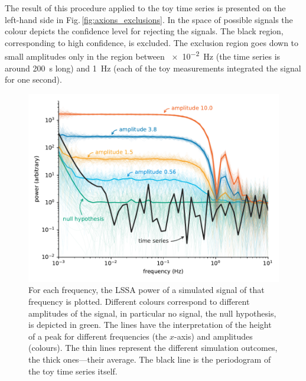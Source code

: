 The result of this procedure applied to the toy time series is presented on the left-hand side in Fig.\,\ref{fig:axions_exclusions}. In the space of possible signals the colour depicts the confidence level for rejecting the signals. The black region, corresponding to high confidence, is excluded. The exclusion region goes down to small amplitudes only in the region between \SI{e-2}{\hertz} (the time series is around \SI{200}{\second} long) and \SI{1}{\hertz} (each of the toy measurements integrated the signal for one second).

\begin{figure}
  \centering \includegraphics[width=\linewidth]{gfx/axions/basic_exclusion_sensitivity.pdf}
  \caption{For each frequency, the LSSA power of a simulated signal of that frequency is plotted. Different colours correspond to different amplitudes of the signal, in particular no signal, the null hypothesis, is depicted in green. The lines have the interpretation of the height of a peak for different frequencies (the $x$-axis) and amplitudes (colours). The thin lines represent the different simulation outcomes, the thick ones---their average. The black line is the periodogram of the toy time series itself.}\label{fig:sensitivity}
\end{figure}

